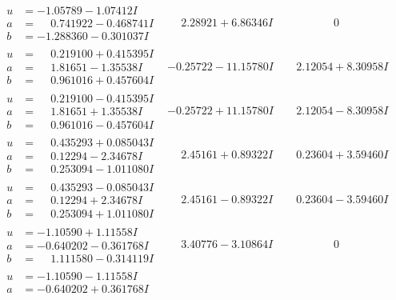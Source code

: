 \documentclass[1p]{elsarticle_modified}
\theoremstyle{definition}
\begin{document}
$$\begin{array}{c|c|c}
\begin{aligned}
u &= -1.05789 - 1.07412 I \\
a &= \phantom{-}0.741922 - 0.468741 I \\
b &= -1.288360 - 0.301037 I\end{aligned}
 & \phantom{-}2.28921 + 6.86346 I & \phantom{-0.000000 } 0 \\ \hline\begin{aligned}
u &= \phantom{-}0.219100 + 0.415395 I \\
a &= \phantom{-}1.81651 - 1.35538 I \\
b &= \phantom{-}0.961016 + 0.457604 I\end{aligned}
 & -0.25722 - 11.15780 I & \phantom{-}2.12054 + 8.30958 I \\ \hline\begin{aligned}
u &= \phantom{-}0.219100 - 0.415395 I \\
a &= \phantom{-}1.81651 + 1.35538 I \\
b &= \phantom{-}0.961016 - 0.457604 I\end{aligned}
 & -0.25722 + 11.15780 I & \phantom{-}2.12054 - 8.30958 I \\ \hline\begin{aligned}
u &= \phantom{-}0.435293 + 0.085043 I \\
a &= \phantom{-}0.12294 - 2.34678 I \\
b &= \phantom{-}0.253094 - 1.011080 I\end{aligned}
 & \phantom{-}2.45161 + 0.89322 I & \phantom{-}0.23604 + 3.59460 I \\ \hline\begin{aligned}
u &= \phantom{-}0.435293 - 0.085043 I \\
a &= \phantom{-}0.12294 + 2.34678 I \\
b &= \phantom{-}0.253094 + 1.011080 I\end{aligned}
 & \phantom{-}2.45161 - 0.89322 I & \phantom{-}0.23604 - 3.59460 I \\ \hline\begin{aligned}
u &= -1.10590 + 1.11558 I \\
a &= -0.640202 - 0.361768 I \\
b &= \phantom{-}1.111580 - 0.314119 I\end{aligned}
 & \phantom{-}3.40776 - 3.10864 I & \phantom{-0.000000 } 0 \\ \hline\begin{aligned}
u &= -1.10590 - 1.11558 I \\
a &= -0.640202 + 0.361768 I \\

\end{aligned}
\end{array}$$
\end{document}
